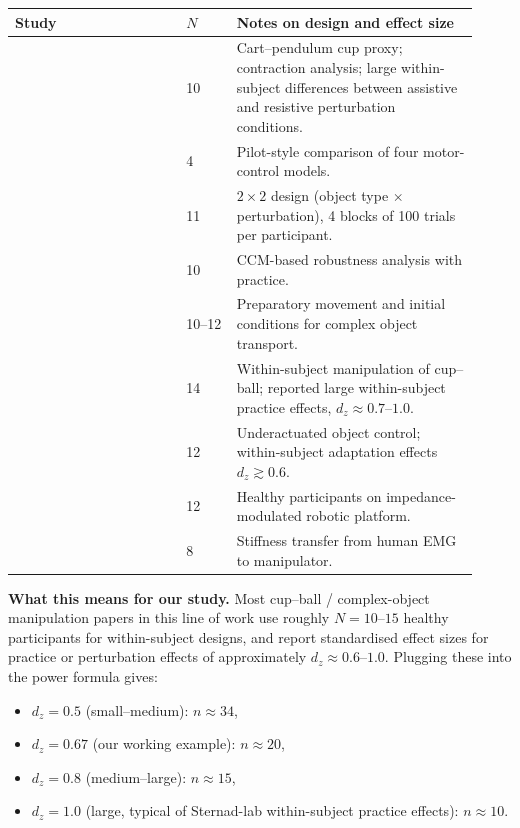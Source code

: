 \documentclass[11pt, a4paper]{article}
\begin{document}
\begin{center}
{\small
\begin{tabular}{p{0.34\linewidth}p{0.10\linewidth}p{0.48\linewidth}}
\toprule
\textbf{Study} & \textbf{$N$} & \textbf{Notes on design and effect size} \\
\midrule
\citet{bazzi2018} & 10 & Cart--pendulum cup proxy; contraction analysis; large within-subject differences between assistive and resistive perturbation conditions. \\
\citet{razavian2021} & 4 & Pilot-style comparison of four motor-control models. \\
\citet{razavian2023} & 11 & $2\times 2$ design (object type $\times$ perturbation), 4 blocks of 100 trials per participant. \\
\citet{bazzi2020} & 10 & CCM-based robustness analysis with practice. \\
\citet{nayeem2021} & 10--12 & Preparatory movement and initial conditions for complex object transport. \\
\citet{hasson2012} & 14 & Within-subject manipulation of cup--ball; reported large within-subject practice effects, $d_z \approx 0.7$--$1.0$. \\
\citet{lokesh2024} & 12 & Underactuated object control; within-subject adaptation effects $d_z \gtrsim 0.6$. \\
\citet{casadio2006} & 12 & Healthy participants on impedance-modulated robotic platform. \\
\citet{ajoudani2012icra} & 8 & Stiffness transfer from human EMG to manipulator. \\
\bottomrule
\end{tabular}}
\end{center}

\textbf{What this means for our study.} Most cup--ball / complex-object manipulation papers in this line of work use roughly $N=10$--$15$ healthy participants for within-subject designs, and report standardised effect sizes for practice or perturbation effects of approximately $d_z \approx 0.6$--$1.0$. Plugging these into the power formula gives:

\begin{itemize}[nosep]
  \item $d_z = 0.5$ (small--medium): $n \approx 34$,
  \item $d_z = 0.67$ (our working example): $n \approx 20$,
  \item $d_z = 0.8$ (medium--large): $n \approx 15$,
  \item $d_z = 1.0$ (large, typical of Sternad-lab within-subject practice effects): $n \approx 10$.
\end{itemize}
\end{document}
